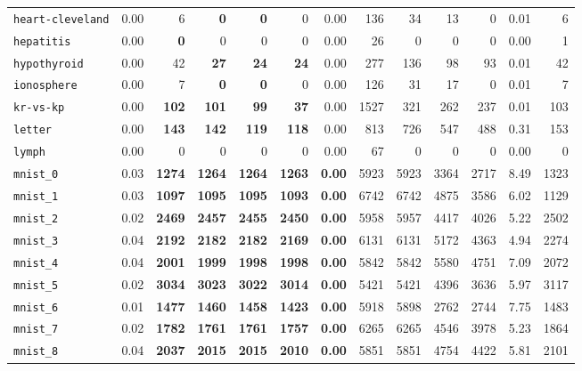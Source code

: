 \begin{tabular}{lrrrrrrrrrrrr}
\texttt{heart-cleveland} & 0.00 & 6 & \textbf{0} & \textbf{0} & 0 & 0.00 & 136 & 34 & 13 & 0 & 0.01 & 6\\
\texttt{hepatitis} & 0.00 & \textbf{0} & 0 & 0 & 0 & 0.00 & 26 & 0 & 0 & 0 & 0.00 & 1\\
\texttt{hypothyroid} & 0.00 & 42 & \textbf{27} & \textbf{24} & \textbf{24} & 0.00 & 277 & 136 & 98 & 93 & 0.01 & 42\\
\texttt{ionosphere} & 0.00 & 7 & \textbf{0} & \textbf{0} & 0 & 0.00 & 126 & 31 & 17 & 0 & 0.01 & 7\\
\texttt{kr-vs-kp} & 0.00 & \textbf{102} & \textbf{101} & \textbf{99} & \textbf{37} & 0.00 & 1527 & 321 & 262 & 237 & 0.01 & 103\\
\texttt{letter} & 0.00 & \textbf{143} & \textbf{142} & \textbf{119} & \textbf{118} & 0.00 & 813 & 726 & 547 & 488 & 0.31 & 153\\
\texttt{lymph} & 0.00 & 0 & 0 & 0 & 0 & 0.00 & 67 & 0 & 0 & 0 & 0.00 & 0\\
\texttt{mnist\_0} & 0.03 & \textbf{1274} & \textbf{1264} & \textbf{1264} & \textbf{1263} & \textbf{0.00} & 5923 & 5923 & 3364 & 2717 & 8.49 & 1323\\
\texttt{mnist\_1} & 0.03 & \textbf{1097} & \textbf{1095} & \textbf{1095} & \textbf{1093} & \textbf{0.00} & 6742 & 6742 & 4875 & 3586 & 6.02 & 1129\\
\texttt{mnist\_2} & 0.02 & \textbf{2469} & \textbf{2457} & \textbf{2455} & \textbf{2450} & \textbf{0.00} & 5958 & 5957 & 4417 & 4026 & 5.22 & 2502\\
\texttt{mnist\_3} & 0.04 & \textbf{2192} & \textbf{2182} & \textbf{2182} & \textbf{2169} & \textbf{0.00} & 6131 & 6131 & 5172 & 4363 & 4.94 & 2274\\
\texttt{mnist\_4} & 0.04 & \textbf{2001} & \textbf{1999} & \textbf{1998} & \textbf{1998} & \textbf{0.00} & 5842 & 5842 & 5580 & 4751 & 7.09 & 2072\\
\texttt{mnist\_5} & 0.02 & \textbf{3034} & \textbf{3023} & \textbf{3022} & \textbf{3014} & \textbf{0.00} & 5421 & 5421 & 4396 & 3636 & 5.97 & 3117\\
\texttt{mnist\_6} & 0.01 & \textbf{1477} & \textbf{1460} & \textbf{1458} & \textbf{1423} & \textbf{0.00} & 5918 & 5898 & 2762 & 2744 & 7.75 & 1483\\
\texttt{mnist\_7} & 0.02 & \textbf{1782} & \textbf{1761} & \textbf{1761} & \textbf{1757} & \textbf{0.00} & 6265 & 6265 & 4546 & 3978 & 5.23 & 1864\\
\texttt{mnist\_8} & 0.04 & \textbf{2037} & \textbf{2015} & \textbf{2015} & \textbf{2010} & \textbf{0.00} & 5851 & 5851 & 4754 & 4422 & 5.81 & 2101\\

\end{tabular}
